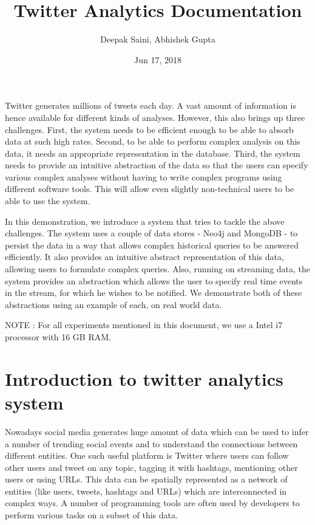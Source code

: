 \documentclass[letterpaper,10pt,english]{sphinxmanual}
\title{Twitter Analytics Documentation}
\date{Jun 17, 2018}
\author{Deepak Saini, Abhishek Gupta}
\begin{document}
\maketitle
\sphinxtableofcontents
{}\label{\detokenize{index::doc}}


Twitter generates millions of tweets each day. A vast amount of information is hence available for different kinds of analyses. However, this also brings up three challenges. First, the system needs to be efficient enough to be able to absorb data at such high rates. Second, to be able to perform complex analysis on this data, it needs an appropriate representation in the database. Third, the system needs to provide an intuitive abstraction of the data so that the users can specify various complex analyses without having to write complex programs using different software tools. This will allow even slightly non-technical users to be able to use the system.

In this demonstration, we introduce a system that tries to tackle the above challenges. The system uses a couple of data stores - Neo4j and MongoDB - to persist the data in a way that allows complex historical queries to be answered efficiently. It also provides an intuitive abstract representation of this data, allowing users to formulate complex queries. Also, running on streaming data, the system provides an abstraction which allows the user to specify real time events in the stream, for which he wishes to be notified. We demonstrate both of these abstractions using an example of each, on real world data.

NOTE : For all experiments mentioned in this document, we use a Intel i7 processor with 16 GB RAM.


\chapter{Introduction to twitter analytics system}
\label{\detokenize{introduction:introduction-to-twitter-analytics-system}}\label{\detokenize{introduction::doc}}
Nowadays social media generates huge amount of data which can be used to infer a number of trending social events and to understand the connections between different entities. One such useful platform is Twitter where users can follow other users and tweet on any topic, tagging it with hashtags, mentioning other users or using URLs. This data can be spatially represented as a network of entities (like users, tweets, hashtags and URLs) which are interconnected in complex ways. A number of programming tools are often used by developers to perform various tasks on a subset of this data.
\end{document}
